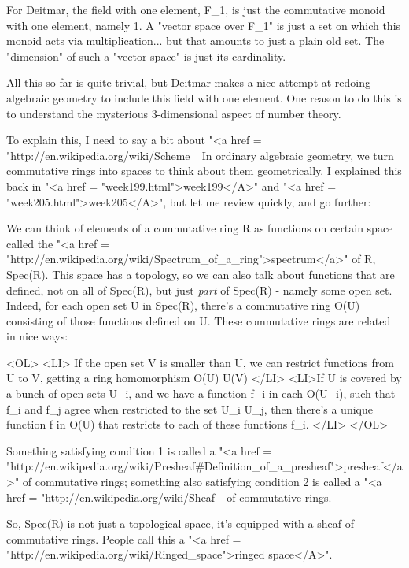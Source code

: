 For Deitmar, the field with one element, F_{1}, is just the
commutative monoid with one element, namely 1.  A "vector space
over F_{1}" is just a set on which this monoid acts via
multiplication... but that amounts to just a plain old set.  The
"dimension" of such a "vector space" is just its
cardinality.

All this so far is quite trivial, but Deitmar makes a nice attempt at 
redoing algebraic geometry to include this field with one element.  
One reason to do this is to understand the mysterious 3-dimensional
aspect of number theory.  

To explain this, I need to say a bit about "<a href =
"http://en.wikipedia.org/wiki/Scheme_%
In ordinary algebraic geometry, we turn commutative rings into spaces
to think about them geometrically.  I explained this back in "<a
href = "week199.html">week199</A>" and "<a href =
"week205.html">week205</A>", but let me review quickly, and go
further:

We can think of elements of a commutative ring R as functions on
certain space called the "<a href =
"http://en.wikipedia.org/wiki/Spectrum_of_a_ring">spectrum</a>"
of R, Spec(R).  This space has a topology, so we can also talk about
functions that are defined, not on all of Spec(R), but just
\emph{part} of Spec(R) - namely some open set.  Indeed, for each
open set U in Spec(R), there's a commutative ring O(U) consisting of
those functions defined on U.  These commutative rings are related in
nice ways:

<OL>
<LI>
If the open set V is smaller than U, we can restrict functions from 
U to V, getting a ring homomorphism O(U) \to  U(V)
</LI>
<LI>If U is covered by a bunch of open sets U_{i}, and we have
a function f_{i} in each O(U_{i}), such that
f_{i} and f_{j} agree when restricted to the set
U_{i} \cap  U_{j}, then there's a unique function f in
O(U) that restricts to each of these functions f_{i}.  </LI>
</OL>

Something satisfying condition 1 is called a "<a href =
"http://en.wikipedia.org/wiki/Presheaf#Definition_of_a_presheaf">presheaf</a>"
of commutative rings; something also satisfying condition 2 is called
a "<a href =
"http://en.wikipedia.org/wiki/Sheaf_%
of commutative rings.

So, Spec(R) is not just a topological space, it's equipped with a
sheaf of commutative rings.  People call this a "<a href =
"http://en.wikipedia.org/wiki/Ringed_space">ringed space</A>".

